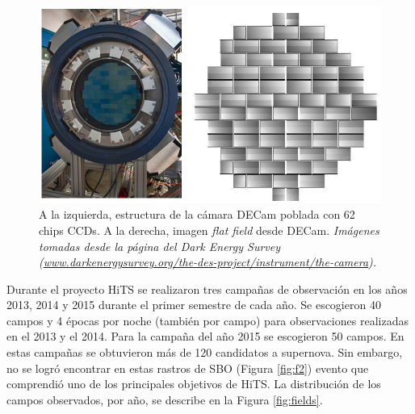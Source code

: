 \begin{figure}[h!]
\centering
\includegraphics[scale=.5]{images/CCDs.jpg}
\caption{A la izquierda, estructura de la c\'amara DECam poblada con 62 chips CCDs. A la derecha, imagen \textit{flat field} desde DECam. \textit{Im\'agenes tomadas desde la p\'agina del Dark Energy Survey (\url{www.darkenergysurvey.org/the-des-project/instrument/the-camera}).}}
\label{fig:f3}
\end{figure}

Durante el proyecto HiTS se realizaron tres campa\~nas de observaci\'on en los a\~nos 2013, 2014 y 2015 durante el primer semestre de cada a\~no. Se escogieron 40 campos y 4 \'epocas por noche (tambi\'en por campo) para observaciones realizadas en el 2013 y el 2014. Para la campa\~na del a\~no 2015 se escogieron 50 campos. En estas campa\~nas se obtuvieron m\'as de 120 candidatos a supernova. Sin embargo, no se logr\'o encontrar en estas rastros de SBO (Figura \ref{fig:f2}) evento que comprendi\'o uno de los principales objetivos de HiTS. La distribuci\'on de los campos observados, por a\~no, se describe en la Figura \ref{fig:fields}. 


